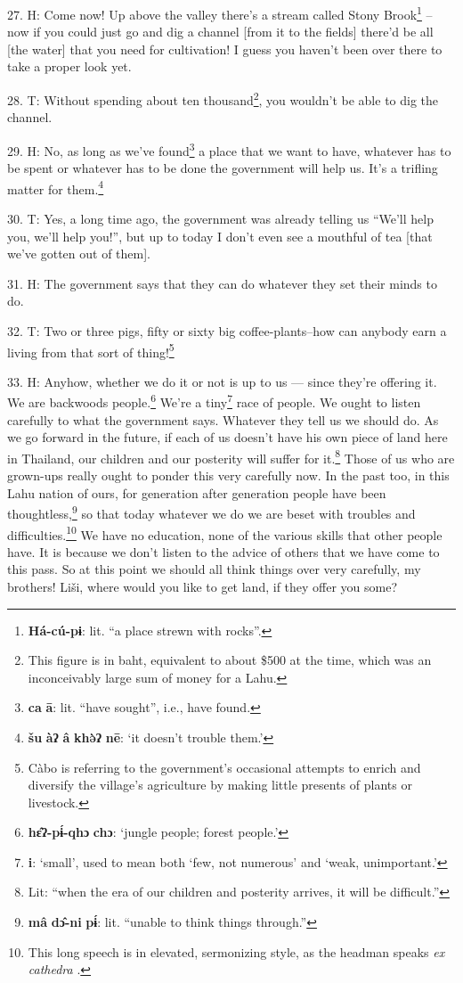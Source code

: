 27. H: Come now! Up above the valley there's a stream called Stony Brook\footnote{\textbf{Há-cú-pɨ}: lit. ``a place strewn with rocks''.} --
now if you could just go and dig a channel [from it to the fields] there'd be all
[the water] that you need for cultivation! I guess you haven't been over there
to take a proper look yet.

28. T: Without spending about ten thousand\footnote{This figure is in baht, equivalent to about \$500 at the time, which was an inconceivably large sum of money for a Lahu.}, you wouldn't be able to dig
the channel.

29. H: No, as long as we've found\footnote{\textbf{ca} \textbf{ā}: lit. ``have sought'', i.e., have found.} a place that we want to have, whatever has
to be spent or whatever has to be done the government will help us. It's a trifling
matter for them.\footnote{\textbf{šu} \textbf{àʔ} \textbf{â} \textbf{khə̀ʔ} \textbf{nē}: `it doesn't trouble them.'}

30. T: Yes, a long time ago, the government was already telling us ``We'll
help you, we'll help you!'', but up to today I don't even see a mouthful of tea
[that we've gotten out of them].

31. H: The government says that they can do whatever they set their minds to do.

32. T: Two or three pigs, fifty or sixty big coffee-plants--how can anybody
earn a living from that sort of thing!\footnote{Càbo is referring to the government's occasional attempts to enrich and diversify the village's agriculture by making little presents of plants or livestock.}

33. H: Anyhow, whether we do it or not is up to us --- since they're offering it.
We are backwoods people.\footnote{\textbf{hɛ̂ʔ-pɨ́-qhɔ} \textbf{chɔ}: `jungle people; forest people.'} We're a tiny\footnote{\textbf{i}: `small', used to mean both `few, not numerous' and `weak, unimportant.'} race of people. We ought to listen
carefully to what the government says. Whatever they tell us we should do. As we
go forward in the future, if each of us doesn't have his own piece of land here
in Thailand, our children and our posterity will suffer for it.\footnote{Lit: ``when the era of our children and posterity arrives, it will be difficult.''} Those of us
who are grown-ups really ought to ponder this very carefully now. In the past too,
in this Lahu nation of ours, for generation after generation people have been thoughtless,\footnote{\textbf{mâ} \textbf{dɔ̂-ni} \textbf{pɨ́}: lit. ``unable to think things through.''}
so that today whatever we do we are beset with troubles and difficulties.\footnote{This long speech is in elevated, sermonizing style, as the headman speaks \textit{ex cathedra} .} We
have no education, none of the various skills that other people have. It is because
we don't listen to the advice of others that we have come to this pass. So at this
point we should all think things over very carefully, my brothers! Liši, where
would you like to get land, if they offer you some?

